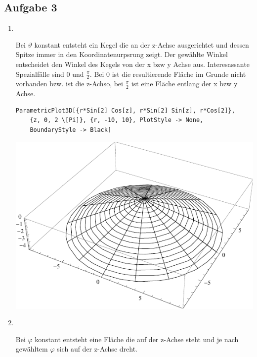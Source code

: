 \documentclass[10pt,a4paper,parskip=half]{scrartcl}
\begin{document}
\subsection*{Aufgabe 3}
\begin{enumerate}[$\quad$]
	\item \ \\ 
	\begin{minipage}{0.50\columnwidth}
	Bei $\vartheta$ konstant entsteht ein Kegel die an der z-Achse ausgerichtet und dessen Spitze immer in den Koordinatenurpsrung zeigt. Der gewählte Winkel entscheidet den Winkel des Kegels von der x bzw y Achse aus. Interesassante Spezialfälle sind 0 und $\frac{\pi}{2}$. Bei 0 ist die resultierende Fläche im Grunde nicht vorhanden bzw. ist die z-Achso, bei $\frac{\pi}{2}$ ist eine Fläche entlang der x bzw y Achse.
	\begin{lstlisting}[caption= Mathematica Code für den Graph von f]
	ParametricPlot3D[{r*Sin[2] Cos[z], r*Sin[2] Sin[z], r*Cos[2]}, 
	{z, 0, 2 \[Pi]}, {r, -10, 10}, PlotStyle -> None, 
	BoundaryStyle -> Black]
	\end{lstlisting}
	\end{minipage}
	\begin{minipage}{0.50\columnwidth}
	\begin{center}
	\includegraphics[scale=0.7]{thetakonstant.pdf} 
	\end{center}
	\end{minipage}
	\item \ \\
	\begin{minipage}{0.50\columnwidth}
	Bei $\varphi$ konstant entsteht eine Fläche die auf der z-Achse steht und je nach gewähltem $\varphi$ sich auf der z-Achse dreht.

\end{minipage}
\end{enumerate}
\end{document}
